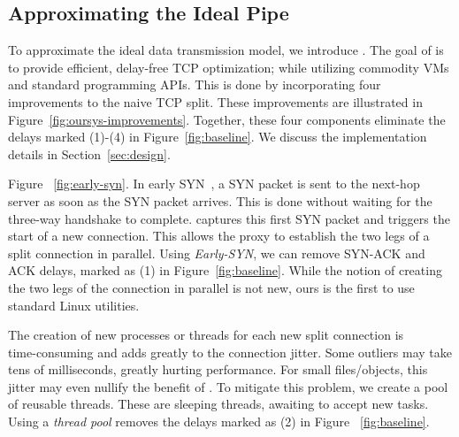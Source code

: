 \subsection{Approximating the Ideal Pipe}\label{sec:approx}

To approximate the ideal data transmission model, we introduce \textit{\oursys}.
The goal of \oursys is to provide efficient, delay-free TCP optimization; while utilizing commodity VMs and standard programming APIs. This is done by incorporating four improvements to the naive TCP split. These improvements are illustrated in Figure~\ref{fig:oursys-improvements}. Together, these four components eliminate the delays marked (1)-(4) in Figure~\ref{fig:baseline}. We discuss the implementation details in Section~\ref{sec:design}.



 \xspace Figure ~\ref{fig:early-syn}. In early SYN~\cite{ladiwala,siracusano2016miniproxy}, a SYN packet is sent to the next-hop server as soon as the SYN packet arrives. This is done without waiting for the three-way handshake to complete. \oursys captures this first SYN packet and triggers the start of a new connection. This allows the proxy to establish the two legs of a split connection in parallel. Using \textit{Early-SYN}, we can remove SYN-ACK and ACK delays, marked as (1) in Figure~\ref{fig:baseline}.
While the notion of creating the two legs of the connection in parallel is not new, ours is the first to use standard Linux utilities.

The creation of new processes or threads for each new split connection is \\time-consuming and adds greatly to the connection jitter. Some outliers may take tens of milliseconds, greatly hurting performance. For small files/objects, this jitter may even nullify the benefit of \oursys. To mitigate this problem, we create a pool of reusable threads. These are sleeping threads, awaiting to accept new tasks. Using a \textit{thread pool} removes the delays marked as (2) in Figure ~\ref{fig:baseline}.

